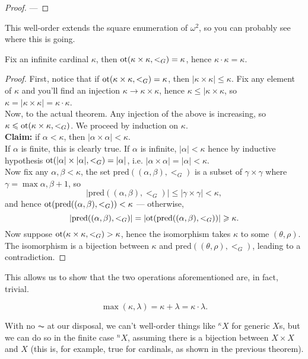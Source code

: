 \documentclass[twoside,openright,titlepage,numbers=noenddot,%
               headinclude,footinclude,cleardoublepage=empty,abstract=on,
               BCOR=23mm,paper=letter,fontsize=11pt
               ]{scrreprt}
\begin{document}
\begin{proof}
    ---
\end{proof}
This well-order extends the square enumeration of $\omega^2$, so you can probably see where this is going.
\begin{theorem}
    Fix an infinite cardinal $\kappa$, then $\mathrm{ot}(\kappa \times \kappa, <_G) = \kappa$, hence $\kappa \cdot \kappa = \kappa$.
\end{theorem}
\begin{proof}
    First, notice that if $\mathrm{ot}(\kappa \times \kappa, <_G) = \kappa$, then $\vert \kappa \times \kappa \vert \leq \kappa$. Fix any element of $\kappa$ and you'll find an injection $\kappa \to \kappa \times \kappa$, hence $\kappa \leq \vert \kappa \times \kappa$, so $\kappa = \vert \kappa \times \kappa \vert = \kappa \cdot \kappa$. \\
    Now, to the actual theorem. Any injection of the above is increasing, so $\kappa \leqslant \mathrm{ot}(\kappa \times \kappa, <_G)$. We proceed by induction on $\kappa$. \\
    \textbf{Claim:} if $\alpha < \kappa$, then $\vert \alpha \times \alpha \vert < \kappa$. \\
    If $\alpha$ is finite, this is clearly true. If $\alpha$ is infinite, $\vert \alpha \vert < \kappa$ hence by inductive hypothesis $\mathrm{ot}(\vert \alpha \vert \times \vert \alpha \vert, <_G) = \vert \alpha \vert$, i.e. $\vert \alpha \times \alpha \vert = \vert \alpha \vert < \kappa$. \\
    Now fix any $\alpha,\beta < \kappa$, the set $\mathrm{pred}((\alpha,\beta),<_G)$ is a subset of $\gamma \times \gamma$ where $\gamma = \max{\alpha,\beta} +1$, so 
    \[ \vert \mathrm{pred}((\alpha,\beta),<_G) \vert \leq \vert \gamma \times \gamma \vert < \kappa, \]
    and hence $\mathrm{ot}(\mathrm{pred}((\alpha,\beta),<_G)) < \kappa$ --- otherwise, 
    \[ \vert \mathrm{pred}((\alpha,\beta),<_G) \vert = \vert \mathrm{ot}(\mathrm{pred}((\alpha,\beta),<_G)) \vert \geqslant \kappa. \]
    Now suppose $\mathrm{ot}(\kappa \times \kappa, <_G) > \kappa$, hence the isomorphism takes $\kappa$ to some $(\theta,\rho)$. The isomorphism is a bijection between $\kappa$ and $\mathrm{pred}((\theta,\rho),<_G)$, leading to a contradiction.
\end{proof}
This allows us to show that the two operations aforementioned are, in fact, trivial.
\begin{corollary}
    \[ \max(\kappa, \lambda) = \kappa + \lambda = \kappa \cdot \lambda. \]
\end{corollary}
With no $\AC$ at our disposal, we can't well-order things like ${}^{\kappa}X$ for generic $X$s, but we can do so in the finite case ${}^n X$, assuming there is a bijection between $X \times X$ and $X$ (this is, for example, true for cardinals, as shown in the previous theorem).
\end{document}

